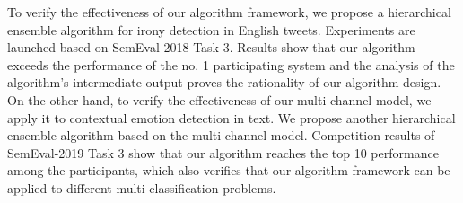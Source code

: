 \begin{eabstract}
\begin{enumerate}
\end{enumerate}

To verify the effectiveness of our algorithm framework, we propose a hierarchical ensemble algorithm for irony detection in English tweets. Experiments are launched based on SemEval-2018 Task 3. Results show that our algorithm exceeds the performance of the no. 1 participating system and the analysis of the algorithm's intermediate output proves the rationality of our algorithm design. On the other hand, to verify the effectiveness of our multi-channel model, we apply it to contextual emotion detection in text. We propose another hierarchical ensemble algorithm based on the multi-channel model. Competition results of SemEval-2019 Task 3 show that our algorithm reaches the top 10 performance among the participants, which also verifies that our algorithm framework can be applied to different multi-classification problems.

\end{eabstract}

